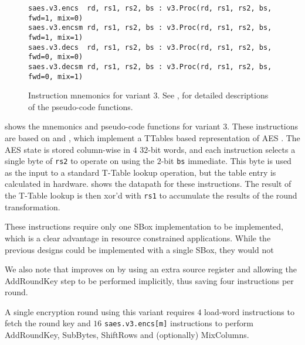 
\begin{figure}
\begin{lstlisting}[language=pseudo,style=block]
saes.v3.encs  rd, rs1, rs2, bs : v3.Proc(rd, rs1, rs2, bs, fwd=1, mix=0)
saes.v3.encsm rd, rs1, rs2, bs : v3.Proc(rd, rs1, rs2, bs, fwd=1, mix=1)
saes.v3.decs  rd, rs1, rs2, bs : v3.Proc(rd, rs1, rs2, bs, fwd=0, mix=0)
saes.v3.decsm rd, rs1, rs2, bs : v3.Proc(rd, rs1, rs2, bs, fwd=0, mix=1)
\end{lstlisting}
\caption{
    Instruction mnemonics for variant 3.
    See ,  for detailed
    descriptions of the pseudo-code functions.
}
\label{fig:mnemonics:v3}
\end{figure}

 shows the mnemonics and pseudo-code functions
for variant 3.
These instructions are based on
\cite{NadIkeKur:04,BBFR:06} and \cite{Saarinen:20},
which implement a TTables based representation of AES \cite{DaeRij:02}.
The AES state is stored column-wise in $4$ $32$-bit words, and
each instruction selects a single byte of {\tt rs2} to operate on
using the $2$-bit {\tt bs} immediate.
This byte is used as the input to a standard T-Table lookup operation,
but the table entry is calculated in hardware.
 shows the datapath for these instructions.
The result of the T-Table lookup is then xor'd with {\tt rs1} to
accumulate the results of the round transformation.

These instructions require only one SBox implementation to be implemented,
which is a clear advantage in resource constrained applications.
While the previous designs could be implemented with a single SBox, they
would not

We also note that \cite{Saarinen:20} improves on \cite{BBFR:06}
by using an extra source register and allowing the AddRoundKey step to be
performed implicitly, thus saving four instructions per round.

A single encryption round using this variant requires
$4$ load-word instructions to fetch the round key and
$16$ {\tt saes.v3.encs[m]} instructions to perform AddRoundKey,
SubBytes, ShiftRows and (optionally) MixColumns.

